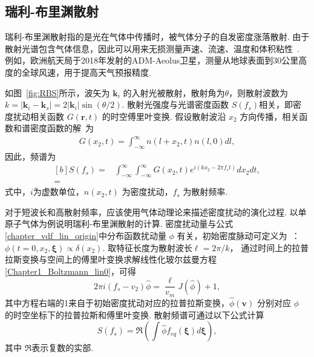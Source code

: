 \subsection{瑞利-布里渊散射}\label{RBS_section}

瑞利-布里渊散射指的是光在气体中传播时，被气体分子的自发密度涨落散射. 由于散射光谱包含气体信息，因此可以用来无损测量声速、流速、温度和体积粘性~\cite{Pan2002,Vieitez2010,guziyu}. 例如，欧洲航天局于2018年发射的ADM-Aeolus卫星，测量从地球表面到30公里高度的全球风速，用于提高天气预报精度. 

如图~\ref{fig:RBS}所示，波矢为 $\bm{k}_i$ 的入射光被散射，散射角为$\theta$，则散射波数为
$k=|\bm{k}_i-\bm{k}_s|=2|\bm{k}_i|\sin\left({\theta}/{2}\right)$.
散射光强度与光谱密度函数 $S(f_s)$相关，即密度扰动相关函数  $G(\bm{r},t)$ 的时空傅里叶变换. 假设散射波沿 $x_2$ 方向传播，相关函数和谱密度函数的解~\cite{Sugawara1968PoF,Reichl2016}为
\begin{align}
G(x_2,t) = \int_{-\infty}^{\infty}{n}(l+x_2,t){n}(l,0)dl,
\label{correlation function}
\end{align}
因此，频谱为
\begin{equation}\label{spectral density}
\begin{aligned}[b]
S(f_s) =& \int_{-\infty}^{\infty}\int_{-\infty}^{\infty}G(x_2,t)e^{i(kx_2-2\pi{f_s}t)}dx_2dt, 
\\
=& %
\end{aligned}
\end{equation}
式中，$i$为虚数单位，${n}(x_2,t)$ 为密度扰动，$f_s$ 为散射频率.



对于短波长和高散射频率，应该使用气体动理论来描述密度扰动的演化过程. 以单原子气体为例说明瑞利-布里渊散射的计算. 密度扰动量与公式\eqref{chapter_vdf_lin_origin}中分布函数扰动量  $\phi$ 有关，初始密度脉动可定义为~\cite{Sugawara1968PoF,LeiJFM2015}：
$\phi(t=0,{x_2},\bm{\xi})\propto{}\delta({x_2})$. 取特征长度为散射波长$\ell=2\pi/k$，
通过时间上的拉普拉斯变换与空间上的傅里叶变换求解线性化玻尔兹曼方程\eqref{Chapter1_Boltzmann_lin0}，可得
\begin{equation}\label{SRBS_LBE}
2\pi{i}(f_s-v_2)\hat{\phi}=\frac{\ell}{v_m}J(\hat{\phi})+1,
\end{equation}
其中方程右端的1来自于初始密度扰动对应的拉普拉斯变换，$\hat{\phi}(\bm{v})$ 分别对应 $\phi$ 的时空坐标下的拉普拉斯和傅里叶变换\cite{Gu2020AIA}. 散射频谱可通过以下公式计算
\begin{equation}\label{SRBS}
S(f_s)=\Re\left(\int \hat{\phi} f_{eq}(\bm{\xi})d\bm{\xi}\right),
\end{equation}
其中 $\Re$表示复数的实部.


